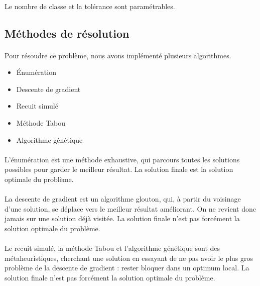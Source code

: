 \documentclass[12pt]{article}
\begin{document}
\paragraph{}Le nombre de classe et la tolérance sont paramétrables.

\subsection{Méthodes de résolution}

\paragraph{}Pour résoudre ce problème, nous avons implémenté plusieurs algorithmes.
\begin{itemize}
	\item Énumération
	\item Descente de gradient
	\item Recuit simulé
	\item Méthode Tabou
	\item Algorithme génétique
\end{itemize}

\paragraph{}L'énumération est une méthode exhaustive, qui parcours toutes les solutions possibles pour garder le meilleur résultat. La solution finale est la solution optimale du problème.

\paragraph{}La descente de gradient est un algorithme glouton, qui, à partir du voisinage d'une solution, se déplace vers le meilleur résultat améliorant. On ne revient donc jamais sur une solution déjà visitée. La solution finale n'est pas forcément la solution optimale du problème.

\paragraph{}Le recuit simulé, la méthode Tabou et l'algorithme génétique sont des métaheuristiques, cherchant une solution en essayant de ne pas avoir le plus gros problème de la descente de gradient : rester bloquer dans un optimum local. La solution finale n'est pas forcément la solution optimale du problème.
\end{document}
